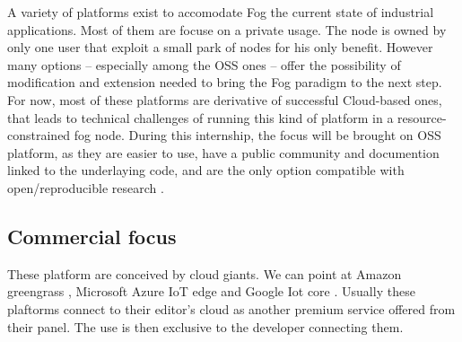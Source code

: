\documentclass[11pt]{sdm}
\begin{document}
A variety of platforms exist to accomodate Fog the current state of industrial applications. Most of them are focuse on a private usage. The node is owned by only one user that exploit a small park of nodes for his only benefit. However many options -- especially among the \gls{OSS} ones -- offer the possibility of modification and extension needed to bring the Fog paradigm to the next step. For now, most of these platforms are derivative of successful Cloud-based ones, that leads to technical challenges of running this kind of platform in a resource-constrained fog node.
During this internship, the focus will be brought on \gls{OSS} platform, as they are easier to use, have a public community and documention linked to the underlaying code, and are the only option compatible with open/reproducible research \cite{kjorveziroski_iot_2021}.


\subsection{Commercial focus}

These platform are conceived by cloud giants. We can point at Amazon greengrass \cite{noauthor_aws_nodate}, Microsoft Azure IoT edge \cite{noauthor_iot_nodate} and Google Iot core \cite{noauthor_cloud_nodate}. Usually these plaftorms connect to their editor's cloud as another premium service offered from their panel. The use is then exclusive to the developer connecting them.

%    
\end{document}
